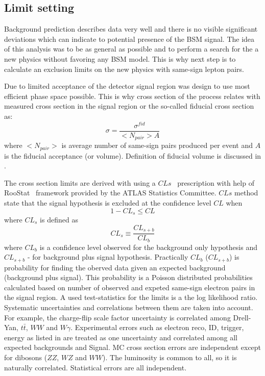 \subsection{Limit setting}

Background prediction describes data very well and there is no visible significant deviations which can indicate to potential presence of the BSM signal.
The idea of this analysis was to be as general as possible and to perform a search for the a new physics without favoring any BSM model.
This is why next step is to calculate an exclusion limits on the new physics with same-sign lepton pairs.

Due to limited acceptance of the detector signal region was design to use most efficient phase space possible.
This is why cross section of the process relates with measured cross section in the signal region or the so-called fiducial cross section as:
\begin{equation}
 \sigma = \dfrac{\sigma^{fid}}{<N_{pair}>A}
 \label{eq:cross_section}
\end{equation}
where $<N_{pair}>$ is average number of same-sign pairs produced per event and $A$ is the fiducial acceptance (or volume).
Definition of fiducial volume is discussed in .

The cross section limits are derived with using a $CLs$~\cite{CLs_tecnique,CLs_2} prescription with help of RooStat~\cite{RooStat_project} framework 
provided by the ATLAS Statistics Committee. $CLs$ method state that the signal hypothesis is excluded at the confidence level $CL$ when
\begin{equation}
 1 - CL_s \leq CL
\end{equation}
where $CL_s$ is defined as
\begin{equation}
 CL_s \equiv \dfrac{CL_{s+b}}{CL_b}
\end{equation}
where $CL_b$ is a confidence level observed for the background only hypothesis and $CL_{s+b}$ - for background plus signal hypothesis.
Practically $CL_b$ ($CL_{s+b}$) is probability for finding the oberved data given an expected background (background plus signal).
This probability is a Poisson distributed probabilities calculated based on number of observed and expeted same-sign electron pairs in the signal region.
A used test-statistics for the limits is a the log likelihood ratio.
 Systematic uncertainties and correlations between them are taken into account.
For example, the charge-flip scale factor uncertainty is correlated among Drell-Yan, $t\bar{t}$, $WW$ and $W\gamma$.
Experimental errors such as electron reco, ID, trigger, energy as listed in are treated as one uncertainty and correlated among all expected backgrounds and Signal.
MC cross section errors are independent except for dibosons ($ZZ$, $WZ$ and $WW$).
The luminosity is common to all, so it is naturally correlated.
Statistical errors are all independent.

